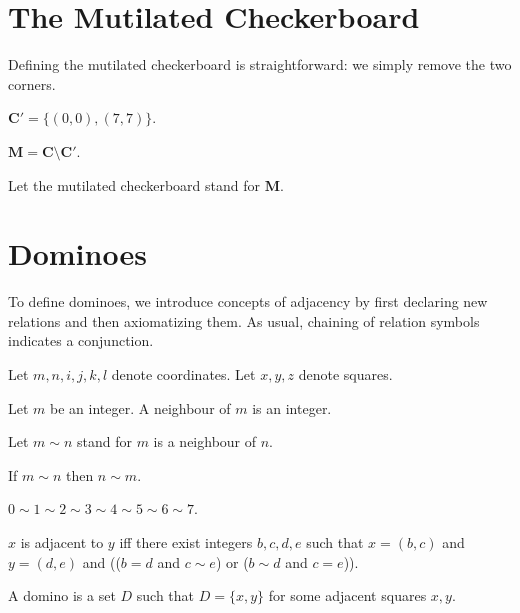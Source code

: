 \documentclass{article}
\newcommand{\Checkerboard}{\mathbf{C}}
\newcommand{\Corners}{\mathbf{C'}}
\newcommand{\Mutilated}{\mathbf{M}}
\begin{document}
\section{The Mutilated Checkerboard}

Defining the mutilated checkerboard is straightforward:
we simply remove the two corners.

\begin{forthel}
    \begin{definition}
        $\Corners = \{ (0, 0), (7, 7) \}$.
    \end{definition}

    \begin{definition}
        $\Mutilated = \Checkerboard \setminus \Corners$.
    \end{definition}

    Let the mutilated checkerboard stand for $\Mutilated$.
\end{forthel}



\section{Dominoes}

To define dominoes,
we introduce concepts of adjacency by first declaring new relations and then axiomatizing them.
As usual, chaining of relation symbols indicates a conjunction.

\begin{forthel}
    Let $m, n, i, j, k, l$ denote coordinates.
    Let $x, y, z$ denote squares.

    \begin{signature}
        Let $m$ be an integer. A neighbour of $m$ is an integer.
    \end{signature}
    Let $m\sim n$ stand for $m$ is a neighbour of $n$.

    \begin{axiom}
        If $m\sim n$ then $n\sim m$.
    \end{axiom}
    \begin{axiom}
        $0\sim 1\sim 2\sim 3\sim 4\sim 5\sim 6\sim 7$.
    \end{axiom}

    \begin{definition}
        $x$ is adjacent to $y$ iff
        there exist integers $b, c, d, e$ such that
        $x = (b, c)$ and $y = (d, e)$ and
        (($b = d$  and $c\sim e$) or
        ($b\sim d$ and $c = e$)).
    \end{definition}

    \begin{definition}
        A domino is a set $D$ such that $D = \{x, y\}$ for some
        adjacent squares $x, y$.
    \end{definition}
\end{forthel}
\end{document}
